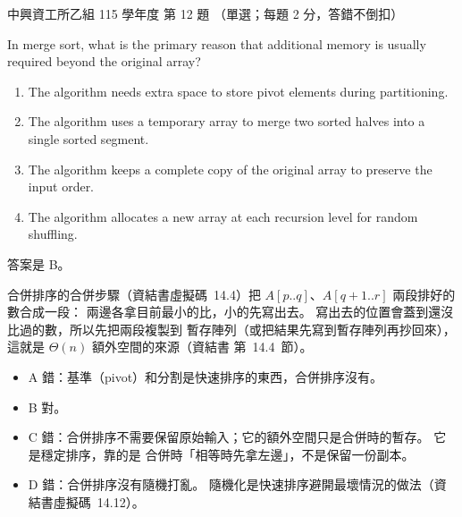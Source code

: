 \begin{pastexam}[label={px:nchu-115-is-12}]{中興資工所乙組 115 學年度 第 12 題}
（單選；每題 2 分，答錯不倒扣）

In merge sort, what is the primary reason that additional memory is usually required beyond the
original array?
\begin{enumerate}[label=\Alph*.,nosep]
\item The algorithm needs extra space to store pivot elements during partitioning.
\item The algorithm uses a temporary array to merge two sorted halves into a single sorted
segment.
\item The algorithm keeps a complete copy of the original array to preserve the input order.
\item The algorithm allocates a new array at each recursion level for random shuffling.
\end{enumerate}
\end{pastexam}

\begin{pastsoln}
答案是 B。

合併排序的合併步驟（資結書虛擬碼~14.4）把 $A[p..q]$、$A[q+1..r]$ 兩段排好的數合成一段：
兩邊各拿目前最小的比，小的先寫出去。 寫出去的位置會蓋到還沒比過的數，所以先把兩段複製到
暫存陣列（或把結果先寫到暫存陣列再抄回來），這就是 $\Theta(n)$ 額外空間的來源（資結書
第~14.4~節）。
\begin{itemize}
\item A 錯：基準（pivot）和分割是快速排序的東西，合併排序沒有。
\item B 對。
\item C 錯：合併排序不需要保留原始輸入；它的額外空間只是合併時的暫存。 它是穩定排序，靠的是
合併時「相等時先拿左邊」，不是保留一份副本。
\item D 錯：合併排序沒有隨機打亂。 隨機化是快速排序避開最壞情況的做法（資結書虛擬碼~14.12）。
\end{itemize}
\end{pastsoln}
